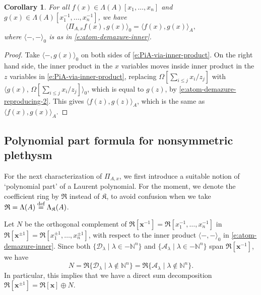 \documentclass[12pt]{amsart}
\newtheorem{cor}[thm]{Corollary}
\theoremstyle{definition}
\theoremstyle{remark}
\newcommand{\NN}{{\mathbb N}}
\newcommand{\xx}{{\mathbf x}}
\newcommand{\Kfrak}{{\mathfrak K}}
\newcommand{\Rfrak}{{\mathfrak R}}
\newcommand{\Acal}{{\mathcal A}}
\newcommand{\Dcal}{{\mathcal D}}
\newcommand{\defeq}{\mathrel{\overset{\text{{\rm def}}}{=}}}
\begin{document}
\begin{cor}\label{cor:PiA-inner-products}
For all $f(x)\in \Lambda (A)[x_{1},\ldots,x_{n}]$ and $g(x)\in \Lambda
(A)[x_{1}^{-1},\ldots,x_{n}^{-1}]$, we have
\begin{equation}
\label{e:PiA-inner-products}
\langle \Pi _{A,x}f(x),g(x) \rangle_{0} = \langle f(x), g(x)
\rangle_{A},
\end{equation}
where $\langle -,- \rangle_{0}$ is as in
\eqref{e:atom-demazure-inner}.
\end{cor}

\begin{proof}
Take $\langle -, g(x) \rangle_0$ on both sides of
\eqref{e:PiA-via-inner-product}.  On the right hand side, the inner product
in the $x$ variables moves inside inner product in the $z$ variables
in \eqref{e:PiA-via-inner-product}, replacing $\Omega [\sum _{i\leq
j}x_{i}/z_{j}]$ with $\langle g(x),\, \Omega [\sum _{i\leq
j}x_{i}/z_{j}] \rangle_{0}$, which is equal to $g(z)$, by
\eqref{e:atom-demazure-reproducing-2}.  This gives $\langle f(z), g(z)
\rangle_{A}$, which is the same as $\langle f(x), g(x) \rangle_{A}$.
\end{proof}


\subsection{Polynomial part formula for nonsymmetric plethysm}
\label{ss:PiA-via-pol}

For the next characterization of $\Pi _{A,x}$, we first introduce a
suitable notion of `polynomial part' of a Laurent polynomial.
For the moment, we denote the coefficient ring by $\Rfrak $
instead of $\Kfrak $, to avoid confusion when we take
$\Rfrak =\Lambda (A)\defeq \Lambda _{\Kfrak }(A)$.



Let $N$ be the orthogonal complement of $\Rfrak [\xx ^{-1}] = \Rfrak
[x_{1}^{-1}, \ldots, x_{n}^{-1}]$ in $\Rfrak [\xx ^{\pm 1}] = \Rfrak
[x_{1}^{\pm 1},\ldots,x_{n}^{\pm 1}]$, with respect to the inner
product $\langle -,- \rangle_{0}$ in \eqref{e:atom-demazure-inner}.
Since both $\{ \Dcal _{\lambda } \mid \lambda \in -\NN ^{n}\}$ and $\{
\Acal _{\lambda } \mid \lambda \in -\NN ^{n}\}$ span $\Rfrak [\xx
^{-1}]$, we have
\begin{equation}\label{e:N-explicit}
N = \Rfrak \{\Dcal _{\lambda }\mid \lambda \not \in \NN ^{n} \} =
\Rfrak \{\Acal _{\lambda }\mid \lambda \not \in \NN ^{n} \}.
\end{equation}
In particular, this implies that we have a direct sum decomposition
$\Rfrak [\xx ^{\pm 1}] = \Rfrak [\xx ]\oplus N$.
\end{document}
